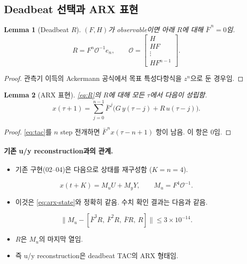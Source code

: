 \documentclass[11pt,a4paper]{article}
\newtheorem{lemma}{Lemma}
\newcommand{\Fb}{\bar F}
\begin{document}
\subsection{Deadbeat 선택과 ARX 표현}
\begin{lemma}[Deadbeat $R$]
$(F,H)$가 observable이면 아래 $R$에 대해 $\Fb^{\,n}=0$임.
\begin{equation}
R=F^n\mathcal O^{-1}e_n,\qquad \mathcal O=\begin{bmatrix}H\\HF\\\vdots\\HF^{n-1}\end{bmatrix}.
\label{eq:R}
\end{equation}
\end{lemma}
\begin{proof}
관측기 이득의 Ackermann 공식에서 목표 특성다항식을 $z^n$으로 둔 경우임.
\end{proof}

\begin{lemma}[ARX 표현]
\eqref{eq:R}의 $R$에 대해 모든 $\tau$에서 다음이 성립함.
\begin{equation}
x(\tau+1)=\sum_{j=0}^{n-1}\Fb^{\,j}\bigl(G\,y(\tau-j)+R\,u(\tau-j)\bigr).
\label{eq:arx-state}
\end{equation}
\end{lemma}
\begin{proof}
\eqref{eq:tac}를 $n$ step 전개하면 $\Fb^{\,n}x(\tau-n+1)$ 항이 남음. 이 항은 0임.
\end{proof}

\paragraph{기존 u/y reconstruction과의 관계.}
\begin{itemize}
\item 기존 구현(02--04)은 다음으로 상태를 재구성함 ($K=n=4$).
\end{itemize}
\begin{equation}
x(t+K)=M_uU+M_yY,\qquad M_u=F^4\mathcal O^{-1}.
\end{equation}
\begin{itemize}
\item 이것은 \eqref{eq:arx-state}와 정확히 같음. 수치 확인 결과는 다음과 같음.
\end{itemize}
\begin{equation}
\bigl\|M_u-[\Fb^3R,\ \Fb^2R,\ \Fb R,\ R]\bigr\|\le3\times10^{-14}.
\end{equation}
\begin{itemize}
\item $R$은 $M_u$의 마지막 열임.
\item 즉 u/y reconstruction은 deadbeat TAC의 ARX 형태임.
\end{itemize}
\end{document}
